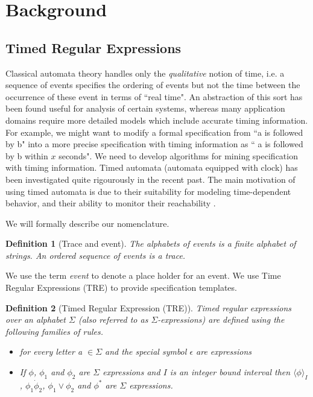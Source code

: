 \documentclass[]{sigplanconf}
\begin{document}




\section{Background} \label{Background}

\subsection{Timed Regular Expressions}

Classical automata theory handles only the \emph{qualitative} notion of time, i.e. a sequence of events specifies the ordering of events but not the time between the occurrence of these event in terms of ``real time". An abstraction of this sort has been found useful for analysis of certain systems, whereas many application domains require more detailed models which include accurate timing information. For example, we might want to modify a formal specification from ``a is followed by b" into a more precise specification with timing information as `` a is followed by b within $x$ seconds". We need to develop algorithms for mining specification with timing information. Timed automata \cite{AD94} (automata equipped with clock) has been investigated quite rigourously in the recent past. The main motivation of using timed automata is due to their suitability for modeling time-dependent behavior, and their ability to monitor their reachability \cite{LPY97}.

We will formally describe our nomenclature.

\newtheorem{defns}{Definition}

\begin{defns}[Trace and event]
The alphabets of events is a finite alphabet of strings. An ordered sequence of events is a trace.
\end{defns}

We use the term \emph{event} to denote a place holder for an event. We use Time Regular Expressions (TRE) \cite{timedregex} to provide specification templates.

\begin{defns}[Timed Regular Expression (TRE)\cite{timedregex}] Timed regular expressions over an alphabet $\Sigma$ (also referred to as $\Sigma$-expressions) are defined using the following families of rules.
\begin{itemize}
  \item  {} for every letter a $\in \Sigma$ and the special symbol $\epsilon$ are expressions
  \item If $\phi$, $\phi_1$ and $\phi_2$ are $\Sigma$ expressions and $I$ is an integer bound interval then $\langle \phi \rangle_I$, $\phi_1 \dot \phi_2$, $\phi_1 \vee \phi_2$ and $\phi^*$ are $\Sigma$ expressions.
\end{itemize}
\end{defns}
\end{document}
